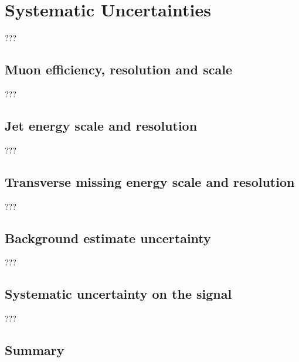 \section{Systematic Uncertainties}
\label{sec:wprimeSystematics}
???
\subsection{Muon efficiency, resolution and scale}
???
\subsection{Jet energy scale and resolution}
???
\subsection{Transverse missing energy scale and resolution}
???
\subsection{Background estimate uncertainty}
???
\subsection{Systematic uncertainty on the signal}
???

\subsection{Summary}

